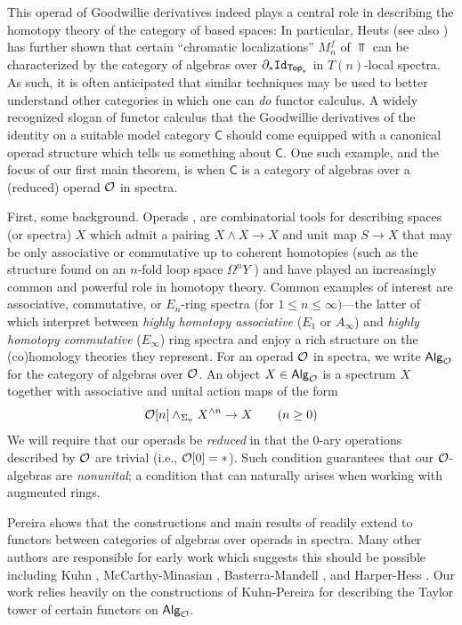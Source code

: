 This operad of Goodwillie derivatives indeed plays a central role in describing the homotopy theory of the category of based spaces: In particular, Heuts \cite{Heuts-vn} (see also \cite{BR}) has further shown that certain ``chromatic localizations'' $M_n^f$ of $\Top$ can be characterized by the category of algebras over $\partial_*\mathtt{Id}_{\mathsf{Top}_*}$ in $T(n)$-local spectra. As such, it is often anticipated that similar techniques may be used to better understand other categories in which one can \textit{do} functor calculus. A widely recognized slogan of functor calculus that the Goodwillie derivatives of the identity on a suitable model category $\mathsf{C}$ should come equipped with a canonical operad structure which tells us something about $\mathsf{C}$. One such example, and the focus of our first main theorem, is when $\mathsf{C}$ is a category of algebras over a (reduced) operad $\mathcal{O}$ in spectra. 


First, some background. Operads \cite{May-geom}, \cite{BV} are combinatorial tools for describing spaces (or spectra) $X$ which admit a pairing $X\wedge X\to X$ and unit map $S\to X$ that may be only associative or commutative up to coherent homotopies (such as the structure found on an $n$-fold loop space $\Omega^n Y$ \cite{May-geom}) and have played an increasingly common and powerful role in homotopy theory. Common examples of interest are associative, commutative, or $E_n$-ring spectra (for $1\leq n\leq \infty)$---the latter of which interpret between \textit{highly homotopy associative} ($E_1$ or $A_{\infty}$) and \textit{highly homotopy commutative} ($E_{\infty}$) ring spectra and enjoy a rich structure on the (co)homology theories they represent. For an operad $\mathcal{O}$ in spectra, we write ${\mathsf{Alg}_{\mathcal{O}}}$ for the category of algebras over $\mathcal{O}$. An object $X\in {\mathsf{Alg}_{\mathcal{O}}}$ is a spectrum $X$ together with associative and unital action maps of the form \[ \mathcal{O}[n] \wedge_{\Sigma_n} X^{\wedge n}\to X \quad \quad (n\geq 0)\] We will require that our operads be \textit{reduced} in that the $0$-ary operations described by $\mathcal{O}$ are trivial (i.e., $\mathcal{O}[0]=*$). Such condition guarantees that our $\mathcal{O}$-algebras are \textit{nonunital}; a condition that can naturally arises when working with augmented rings. 

Pereira \cite{Per-thesis} shows that the constructions and main results of \cite{Goo-Calc3} readily extend to functors between categories of algebras over operads in spectra. Many other authors are responsible for early work which suggests this should be possible including Kuhn \cite{KuhFC}, McCarthy-Minasian \cite{MM}, Basterra-Mandell \cite{Bast-Man}, and Harper-Hess \cite{Har-Hess}. Our work relies heavily on the constructions of Kuhn-Pereira \cite{KuhPer} for describing the Taylor tower of certain functors on ${\mathsf{Alg}_{\mathcal{O}}}$. 



